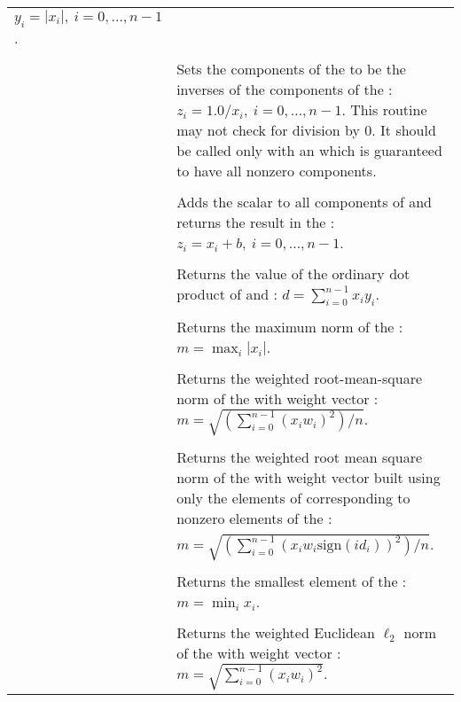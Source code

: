 \begin{xtabular}{|p{\colone}|p{\coltwo}|}
$y_i = | x_i | , \: i=0,\ldots,n-1$.
\\[2mm]
 &  \\
& Sets the components of the   to be the inverses
of the components of the  :
$z_i = 1.0 /  x_i  , \: i=0,\ldots,n-1$. This routine
may not check for division by $0$. It should be called only with an 
 which is guaranteed to have all nonzero components.
\\[2mm]
 &  \\
& Adds the  scalar  to all components of  
and returns the result in the  :
$z_i = x_i + b , \: i=0,\ldots,n-1$.
\\[2mm]
 &  \\
& Returns the value of the ordinary dot product of  and :
$d=\sum_{i=0}^{n-1} x_i y_i$.
\\[2mm]
 &  \\
& Returns the maximum norm of the  :
$m = \max_{i} | x_i |$.
\\[2mm]
 &  \\
& Returns the weighted root-mean-square norm of the   with
 weight vector :
$m = \sqrt{\left( \sum_{i=0}^{n-1} (x_i w_i)^2 \right) / n}$.
\\[2mm]
 &  \\
& Returns the weighted root mean square norm of the   with
 weight vector  built using only 
the elements of  corresponding to
nonzero elements of the  :\\
&$m = \sqrt{\left( \sum_{i=0}^{n-1} (x_i w_i \text{sign}(id_i))^2 \right) / n}$.
\\[2mm]
 &  \\
& Returns the smallest element of the  :
$m = \min_i x_i $.
\\[2mm]
 &  \\
& Returns the weighted Euclidean $\ell_2$ norm of the  
with  weight vector : 
$m = \sqrt{\sum_{i=0}^{n-1} (x_i w_i)^2}$.
\\[2mm]

\end{xtabular}
